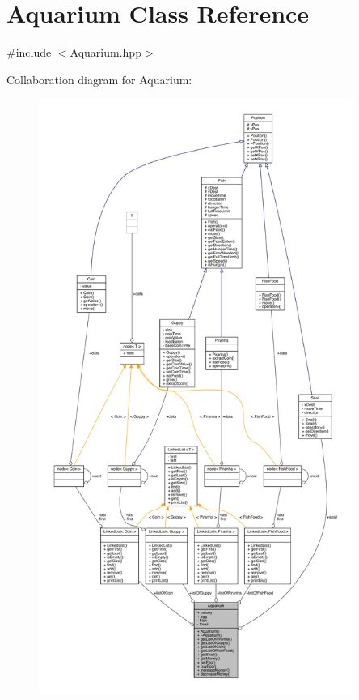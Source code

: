 \hypertarget{class_aquarium}{}\section{Aquarium Class Reference}
\label{class_aquarium}


{\ttfamily \#include $<$Aquarium.\+hpp$>$}



Collaboration diagram for Aquarium\+:
\nopagebreak
\begin{figure}[H]
\begin{center}
\leavevmode
\includegraphics[height=550pt]{class_aquarium__coll__graph}
\end{center}
\end{figure}
